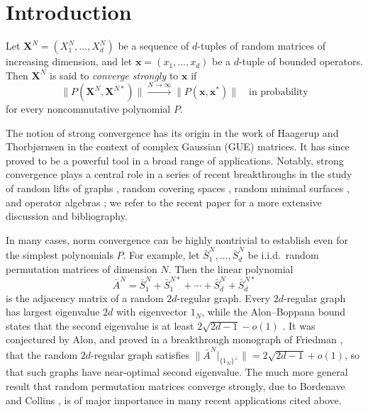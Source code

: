 \documentclass[10pt,reqno]{amsart}
\theoremstyle{definition}
\theoremstyle{remark}
\numberwithin{equation}{section}
\numberwithin{figure}{section}
\numberwithin{table}{section}
\begin{document}


\maketitle

\section{Introduction}
\label{sec:intro}

Let $\boldsymbol{X}^N=(X_1^N,\ldots,X_d^N)$ be a sequence of $d$-tuples of 
random matrices of increasing dimension, and let
$\boldsymbol{x}=(x_1,\ldots,x_d)$ be a $d$-tuple of bounded operators.
Then $\boldsymbol{X}^N$ is said to \emph{converge strongly} 
to $\boldsymbol{x}$ if
$$
	\|P(\boldsymbol{X}^N,\boldsymbol{X}^{N*})\|
	\xrightarrow{N\to\infty}
	\|P(\boldsymbol{x},\boldsymbol{x}^*)\|
	\quad\text{in probability}
$$
for every noncommutative polynomial $P$.

The notion of strong convergence has its origin in the work of 
Haagerup and Thorbj{\o}rnsen \cite{HT05} in the context of complex 
Gaussian (GUE) matrices. It has since proved to be a powerful tool in a 
broad range of applications. Notably, strong convergence plays a 
central role in a series of recent breakthroughs in the study of random 
lifts of graphs \cite{BC19}, random covering spaces 
\cite{HM23,LM23,Hid23,MT23}, random minimal surfaces \cite{Son24}, and 
operator algebras \cite{HT05,HST06,Hay22,BC22,HJE23,BC24}; we refer to the 
recent paper \cite{BC24} for a more extensive discussion and bibliography.

In many cases, norm convergence can be highly nontrivial to establish even 
for the simplest polynomials $P$. For example, let $\bar S_1^N,\ldots,\bar 
S_d^N$ be i.i.d.\ random permutation matrices of dimension $N$. Then the
linear polynomial
$$
	\bar A^N = \bar S_1^N + \bar S_1^{N*} + \cdots +
	\bar S_d^N + \bar S_d^{N*}
$$
is the adjacency matrix of a random $2d$-regular graph. Every $2d$-regular 
graph has largest eigenvalue $2d$ with eigenvector $1_N$, while the 
Alon--Boppana bound states that the second eigenvalue is at least 
$2\sqrt{2d-1}-o(1)$ \cite{Nil91}. It was conjectured by Alon, and proved 
in a breakthrough monograph of Friedman \cite{Fri08}, that the random 
$2d$-regular graph satisfies $\|\bar A^N|_{\{1_N\}^\perp}\| = 
2\sqrt{2d-1}+o(1)$, so that such graphs have near-optimal second 
eigenvalue. The much more general result that random permutation matrices 
converge strongly, due to Bordenave and Collins \cite{BC19}, is of major 
importance in many recent applications cited above.
\end{document}
